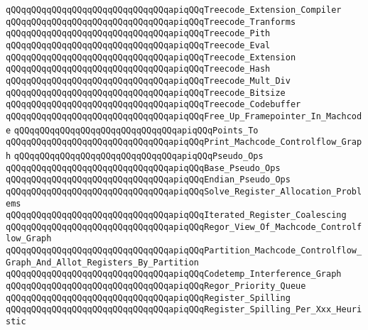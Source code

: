 \verb|qQQqqQQqqQQqqQQqqQQqqQQqqQQqqQQqapiqQQqTreecode_Extension_Compiler|\newline
\verb|qQQqqQQqqQQqqQQqqQQqqQQqqQQqqQQqapiqQQqTreecode_Tranforms|\newline
\verb|qQQqqQQqqQQqqQQqqQQqqQQqqQQqqQQqapiqQQqTreecode_Pith|\newline
\verb|qQQqqQQqqQQqqQQqqQQqqQQqqQQqqQQqapiqQQqTreecode_Eval|\newline
\verb|qQQqqQQqqQQqqQQqqQQqqQQqqQQqqQQqapiqQQqTreecode_Extension|\newline
\verb|qQQqqQQqqQQqqQQqqQQqqQQqqQQqqQQqapiqQQqTreecode_Hash|\newline
\verb|qQQqqQQqqQQqqQQqqQQqqQQqqQQqqQQqapiqQQqTreecode_Mult_Div|\newline
\verb|qQQqqQQqqQQqqQQqqQQqqQQqqQQqqQQqapiqQQqTreecode_Bitsize|\newline
\verb|qQQqqQQqqQQqqQQqqQQqqQQqqQQqqQQqapiqQQqTreecode_Codebuffer|\newline
\verb|qQQqqQQqqQQqqQQqqQQqqQQqqQQqqQQqapiqQQqFree_Up_Framepointer_In_Machcode|\newline
\verb|qQQqqQQqqQQqqQQqqQQqqQQqqQQqqQQqapiqQQqPoints_To|\newline
\verb|qQQqqQQqqQQqqQQqqQQqqQQqqQQqqQQqapiqQQqPrint_Machcode_Controlflow_Graph|\newline
\verb|qQQqqQQqqQQqqQQqqQQqqQQqqQQqqQQqapiqQQqPseudo_Ops|\newline
\verb|qQQqqQQqqQQqqQQqqQQqqQQqqQQqqQQqapiqQQqBase_Pseudo_Ops|\newline
\verb|qQQqqQQqqQQqqQQqqQQqqQQqqQQqqQQqapiqQQqEndian_Pseudo_Ops|\newline
\verb|qQQqqQQqqQQqqQQqqQQqqQQqqQQqqQQqapiqQQqSolve_Register_Allocation_Problems|\newline
\verb|qQQqqQQqqQQqqQQqqQQqqQQqqQQqqQQqapiqQQqIterated_Register_Coalescing|\newline
\verb|qQQqqQQqqQQqqQQqqQQqqQQqqQQqqQQqapiqQQqRegor_View_Of_Machcode_Controlflow_Graph|\newline
\verb|qQQqqQQqqQQqqQQqqQQqqQQqqQQqqQQqapiqQQqPartition_Machcode_Controlflow_Graph_And_Allot_Registers_By_Partition|\newline
\verb|qQQqqQQqqQQqqQQqqQQqqQQqqQQqqQQqapiqQQqCodetemp_Interference_Graph|\newline
\verb|qQQqqQQqqQQqqQQqqQQqqQQqqQQqqQQqapiqQQqRegor_Priority_Queue|\newline
\verb|qQQqqQQqqQQqqQQqqQQqqQQqqQQqqQQqapiqQQqRegister_Spilling|\newline
\verb|qQQqqQQqqQQqqQQqqQQqqQQqqQQqqQQqapiqQQqRegister_Spilling_Per_Xxx_Heuristic|\newline
